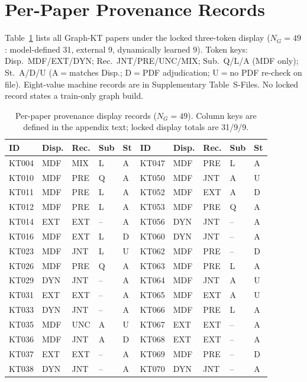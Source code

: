 \documentclass[lettersize,journal]{IEEEtran}
\begin{document}
\section{Per-Paper Provenance Records}
\label{app:provenance}
Table~\ref{tab:prov_appendix} lists all Graph-KT papers under the locked three-token display ($N_G=49$: model-defined 31, external 9, dynamically learned 9). Token keys: Disp.\ MDF/EXT/DYN; Rec.\ JNT/PRE/UNC/MIX; Sub.\ Q/L/A (MDF only); St.\ A/D/U (A$=$matches Disp.; D$=$PDF adjudication; U$=$no PDF re-check on file). Eight-value machine records are in Supplementary Table~S-Files. No locked record states a train-only graph build.
\begin{table}[t]
\caption{Per-paper provenance display records ($N_G=49$). Column keys are defined in the appendix text; locked display totals are 31/9/9.}
\label{tab:prov_appendix}
\centering
\scriptsize
\renewcommand{\arraystretch}{0.92}
\setlength{\tabcolsep}{3.0pt}
\begin{tabular}{@{}lllll@{\hspace{1.4em}}lllll@{}}
\toprule
ID & Disp. & Rec. & Sub & St & ID & Disp. & Rec. & Sub & St \\
\midrule
KT004 & MDF & MIX & L & A & KT047 & MDF & PRE & L & A \\
KT010 & MDF & PRE & Q & A & KT050 & MDF & JNT & A & U \\
KT011 & MDF & PRE & L & A & KT052 & MDF & EXT & A & D \\
KT012 & MDF & PRE & L & A & KT053 & MDF & PRE & Q & A \\
KT014 & EXT & EXT & -- & A & KT056 & DYN & JNT & -- & A \\
KT016 & MDF & EXT & L & D & KT060 & DYN & JNT & -- & A \\
KT023 & MDF & JNT & L & U & KT062 & MDF & PRE & -- & D \\
KT026 & MDF & PRE & Q & A & KT063 & MDF & PRE & L & A \\
KT029 & DYN & JNT & -- & A & KT064 & MDF & JNT & A & U \\
KT031 & EXT & EXT & -- & A & KT065 & MDF & EXT & A & U \\
KT033 & DYN & JNT & -- & A & KT066 & MDF & PRE & L & A \\
KT035 & MDF & UNC & A & U & KT067 & EXT & EXT & -- & A \\
KT036 & MDF & JNT & A & D & KT068 & EXT & EXT & -- & A \\
KT037 & EXT & EXT & -- & A & KT069 & MDF & PRE & -- & D \\
KT038 & DYN & JNT & -- & A & KT070 & DYN & JNT & -- & A \\

\end{tabular}
\end{table}
\end{document}
